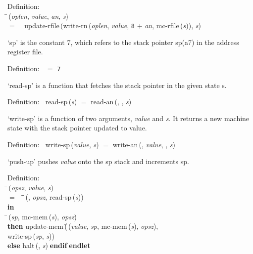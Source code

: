 \begin{tabbing}{\sc Definition}: \\  
\=\,({\it{oplen\/}}, {\it{value\/}}, {\it{an\/}}, {\it{s\/}}) \\ 
$=$$\;\;\;\;${\rm{update-rfile}}\,({\rm{write-rn}}\,({\it{oplen\/}}, {\it{value\/}}, {\tt{8}} $+$ {\it{an\/}}, {\rm{mc-rfile}}\,({\it{s\/}})), {\it{s\/}})\-
\end{tabbing}

 `sp' is the constant 7, which refers to the stack pointer sp(a7) in the 
 address register file.
\begin{tabbing}{\sc Definition}:$\;\;$
{} $=$ {\tt{7}}
\end{tabbing}

 `read-sp' is a function that fetches the stack pointer in the given
 state s.
\begin{tabbing}{\sc Definition}:$\;\;$
{\rm{read-sp}}\,({\it{s\/}}) $=$ {\rm{read-an}}\,({}, {}, {\it{s\/}})
\end{tabbing}

 `write-sp' is a function of two arguments, {\it{value\/}} and {\it{s\/}}.  It returns
 a new machine state with the stack pointer updated to value.
\begin{tabbing}{\sc Definition}:$\;\;$
{\rm{write-sp}}\,({\it{value\/}}, {\it{s\/}}) $=$ {\rm{write-an}}\,({}, {\it{value\/}}, {}, {\it{s\/}})
\end{tabbing}

 `push-up' pushes {\it{value\/}} onto the sp stack and increments sp.
\begin{tabbing}{\sc Definition}: \\  
\=\,({\it{opsz\/}}, {\it{value\/}}, {\it{s\/}}) \\ 
$=$$\;\;\;\;$\=\=\,({}, {\it{opsz\/}}, {\rm{read-sp}}\,({\it{s\/}}))\- \\ 
{\bf in} \\ 
\=\,({\it{sp\/}}, {\rm{mc-mem}}\,({\it{s\/}}), {\it{opsz\/}}) \\ 
{\bf then }{\rm{update-mem}}\,(\=\,({\it{value\/}}, {\it{sp\/}}, {\rm{mc-mem}}\,({\it{s\/}}), {\it{opsz\/}}), \\ 
{\rm{write-sp}}\,({\it{sp\/}}, {\it{s\/}}))\- \\ 
{\bf else }{\rm{halt}}\,({}, {\it{s\/}})$\;${\bf  endif}\-$\;${\bf  endlet}\-\-
\end{tabbing}

